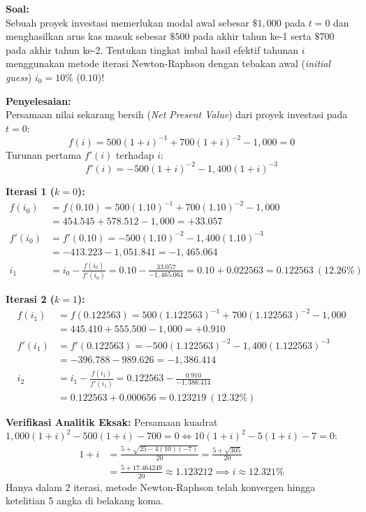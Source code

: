 \documentclass[11pt,a4paper]{article}
\begin{document}
\begin{examplebox}
\textbf{Soal:}\\
Sebuah proyek investasi memerlukan modal awal sebesar $\$1{,}000$ pada $t = 0$ dan menghasilkan arus kas masuk sebesar $\$500$ pada akhir tahun ke-1 serta $\$700$ pada akhir tahun ke-2. Tentukan tingkat imbal hasil efektif tahunan $i$ menggunakan metode iterasi Newton-Raphson dengan tebakan awal (\textit{initial guess}) $i_0 = 10\%$ ($0.10$)!

\vspace{0.5em}
\textbf{Penyelesaian:}\\
Persamaan nilai sekarang bersih (\textit{Net Present Value}) dari proyek investasi pada $t = 0$:
\begin{equation*}
    f(i) = 500(1 + i)^{-1} + 700(1 + i)^{-2} - 1{,}000 = 0
\end{equation*}
Turunan pertama $f'(i)$ terhadap $i$:
\begin{equation*}
    f'(i) = -500(1 + i)^{-2} - 1{,}400(1 + i)^{-3}
\end{equation*}

\textbf{Iterasi 1 ($k = 0$):}
\begin{align*}
    f(i_0) &= f(0.10) = 500(1.10)^{-1} + 700(1.10)^{-2} - 1{,}000 \\
           &= 454.545 + 578.512 - 1{,}000 = +33.057 \\[0.4em]
    f'(i_0) &= f'(0.10) = -500(1.10)^{-2} - 1{,}400(1.10)^{-3} \\
            &= -413.223 - 1{,}051.841 = -1{,}465.064 \\[0.4em]
    i_1 &= i_0 - \frac{f(i_0)}{f'(i_0)} = 0.10 - \frac{33.057}{-1{,}465.064} = 0.10 + 0.022563 = 0.122563 \ (12.26\%)
\end{align*}

\textbf{Iterasi 2 ($k = 1$):}
\begin{align*}
    f(i_1) &= f(0.122563) = 500(1.122563)^{-1} + 700(1.122563)^{-2} - 1{,}000 \\
           &= 445.410 + 555.500 - 1{,}000 = +0.910 \\[0.4em]
    f'(i_1) &= f'(0.122563) = -500(1.122563)^{-2} - 1{,}400(1.122563)^{-3} \\
            &= -396.788 - 989.626 = -1{,}386.414 \\[0.4em]
    i_2 &= i_1 - \frac{f(i_1)}{f'(i_1)} = 0.122563 - \frac{0.910}{-1{,}386.414} \\[0.3em]
            &= 0.122563 + 0.000656 = 0.123219 \ (12.32\%)
\end{align*}

\textbf{Verifikasi Analitik Eksak:}
Persamaan kuadrat $1{,}000(1+i)^2 - 500(1+i) - 700 = 0 \iff 10(1+i)^2 - 5(1+i) - 7 = 0$:
\begin{align*}
    1 + i &= \frac{5 + \sqrt{25 - 4(10)(-7)}}{20} = \frac{5 + \sqrt{305}}{20} \\[0.3em]
          &= \frac{5 + 17.464249}{20} \approx 1.123212 \implies i \approx 12.321\%
\end{align*}
Hanya dalam 2 iterasi, metode Newton-Raphson telah konvergen hingga ketelitian 5 angka di belakang koma.
\end{examplebox}
\end{document}
